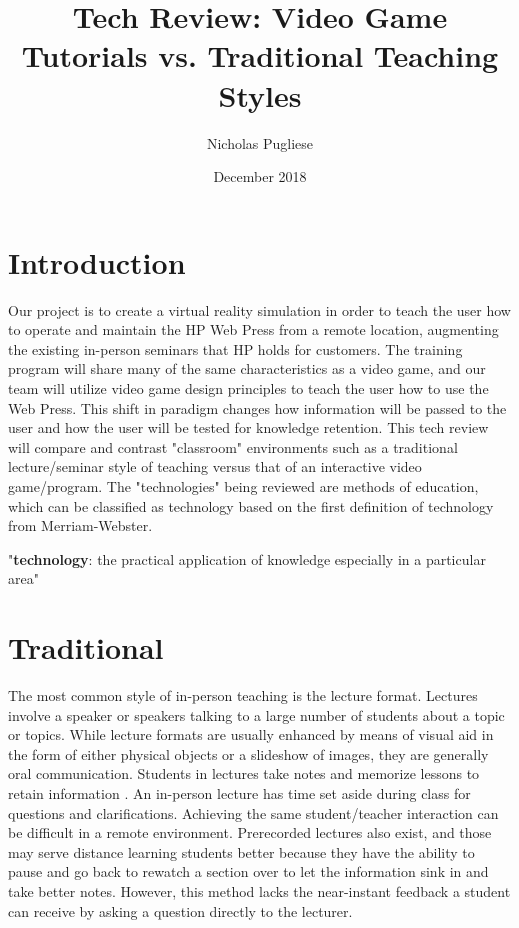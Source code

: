 \documentclass[onecolumn, draftclsnofoot,10pt, compsoc]{IEEEtran}
\title{Tech Review: Video Game Tutorials vs. Traditional Teaching Styles}
\author{Nicholas Pugliese}
\date{December 2018}
\begin{document}
\maketitle

\section{Introduction}
Our project is to create a virtual reality simulation in order to teach the user how to operate and maintain the HP Web Press from a remote location, augmenting the existing in-person seminars that HP holds for customers. The training program will share many of the same characteristics as a video game, and our team will utilize video game design principles to teach the user how to use the Web Press. This shift in paradigm changes how information will be passed to the user and how the user will be tested for knowledge retention. This tech review will compare and contrast "classroom" environments such as a traditional lecture/seminar style of teaching versus that of an interactive video game/program. The "technologies" being reviewed are methods of education, which can be classified as technology based on the first definition of technology from Merriam-Webster.

\begin{displayquote}
"\textbf{technology}: the practical application of knowledge especially in a particular area"
\end{displayquote}

\section{Traditional}
The most common style of in-person teaching is the lecture format. Lectures involve a speaker or speakers talking to a large number of students about a topic or topics. While lecture formats are usually enhanced by means of visual aid in the form of either physical objects or a slideshow of images, they are generally oral communication. Students in lectures take notes and memorize lessons to retain information \cite{lecture}. An in-person lecture has time set aside during class for questions and clarifications. Achieving the same student/teacher interaction can be difficult in a remote environment. Prerecorded lectures also exist, and those may serve distance learning students better because they have the ability to pause and go back to rewatch a section over to let the information sink in and take better notes. However, this method lacks the near-instant feedback a student can receive by asking a question directly to the lecturer.
\end{document}
